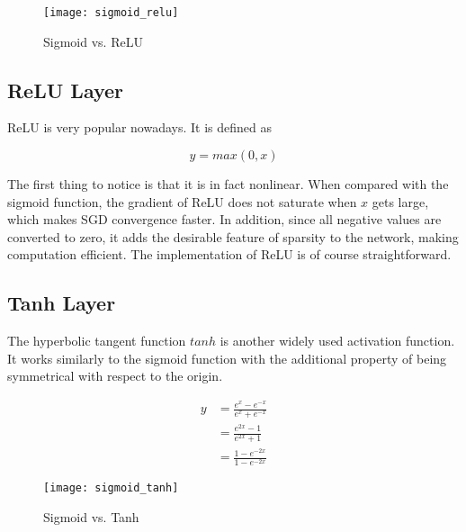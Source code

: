 \begin{figure}[h]
  \centering
  \texttt{[image: sigmoid\_relu]}
  \caption{Sigmoid vs. ReLU}
  \label{fig:sigmoid_relu}
\end{figure}

\subsection{ReLU Layer}

ReLU is very popular nowadays. It is defined as

\begin{equation} \label{eq:relu}
  y = max(0, x)
\end{equation}

The first thing to notice is that it is in fact nonlinear. When compared with the sigmoid function, the
gradient of ReLU does not saturate when $x$ gets large, which makes SGD convergence faster. In addition,
since all negative values are converted to zero, it adds the desirable feature of sparsity to the network,
making computation efficient. The implementation of ReLU is of course straightforward.

\subsection{Tanh Layer}

The hyperbolic tangent function $tanh$ is another widely used activation function. It works similarly to the
sigmoid function with the additional property of being symmetrical with respect to the origin.

\begin{equation} \label{eq:tanh}
  \begin{split}
    y & = \frac{e^x - e^{-x}}{e^{x} + e^{-x}} \\
      & = \frac{e^{2x} - 1}{e^{2x} + 1} \\
      & = \frac{1- e^{-2x}}{1 - e^{-2x}}
  \end{split}
\end{equation}

\begin{figure}[h]
  \centering
  \texttt{[image: sigmoid\_tanh]}
  \caption{Sigmoid vs. Tanh}
  \label{fig:sigmoid_tanh}
\end{figure}

\clearpage %
